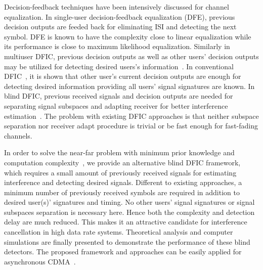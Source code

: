 \documentclass[a4paper,10pt,fleqn, twocolumn]{IEEETran}
\begin{document}
Decision-feedback techniques have been intensively discussed for
channel equalization. In single-user decision-feedback
equalization (DFE), previous decision outputs are feeded back for
eliminating ISI and detecting the next symbol. DFE is known to
have the complexity close to linear equalization while its
performance is close to maximum likelihood equalization. Similarly
in multiuser DFIC, previous decision outputs as well as other
users' decision outputs may be utilized for detecting desired
users's information~\cite{Madh94,Madh98,Wang98,Verd98}. In
conventional DFIC~\cite{Verd98}, it is shown that other user's
current decision outputs are enough for detecting desired
information providing all users' signal signatures are known. In
blind DFIC, previous received signals and decision outputs are
needed for separating signal subspaces and adapting receiver for
better interference estimation~\cite{Madh98,Wang98}. The problem
with existing DFIC approaches is that neither subspace separation
nor receiver adapt procedure is trivial or be fast enough for
fast-fading channels.

In order to solve the near-far problem with minimum prior
knowledge and computation
complexity~\cite{Wang03d,Wang05A,Wang05B}, we provide an
alternative blind DFIC framework, which requires a small amount of
previously received signals for estimating interference and
detecting desired signals. Different to existing approaches, a
minimum number of previously received symbols are required in
addition to desired user(s)' signatures and timing. No other
users' signal signatures or signal subspaces separation is
necessary here. Hence both the complexity and detection delay are
much reduced. This makes it an attractive candidate for
interference cancellation in high data rate systems. Theoretical
analysis and computer simulations are finally presented to
demonstrate the performance of these blind detectors. The proposed
framework and approaches can be easily applied for asynchronous
CDMA~\cite{Wang05A}.
\end{document}
